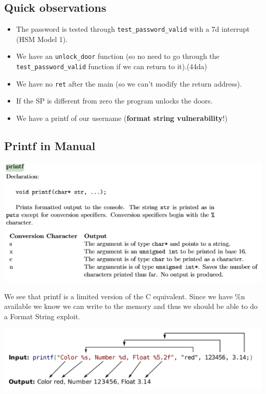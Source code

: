 \subsection{Quick observations}\label{quick-observations}

\begin{itemize}
\itemsep1pt\parskip0pt
\item
  The password is tested through \texttt{test\_password\_valid} with a
  7d interrupt (HSM Model 1).
\item
  We have an \texttt{unlock\_door} function (so no need to go through
  the \texttt{test\_password\_valid} function if we can return to
  it).(44da)
\item
  We have no \texttt{ret} after the main (so we can't modify the return
  address).
\item
  If the SP is different from zero the program unlocks the doors.
\item
  We have a printf of our username (\textbf{format string
  vulnerability}!)
\end{itemize}

\subsection{Printf in Manual}\label{printf-in-manual}

\includegraphics{img/12_2.PNG}

We see that printf is a limited version of the C equivalent. Since we
have \%n available we know we can write to the memory and thus we should
be able to do a Format String exploit.

\includegraphics{img/12_3.PNG}

